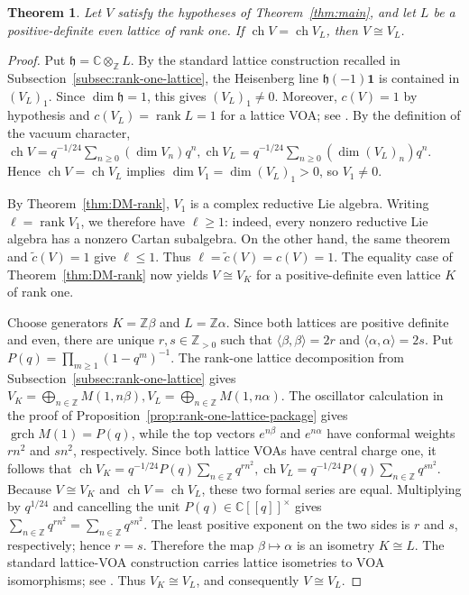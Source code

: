 \documentclass[12pt,leqno]{amsart}
\numberwithin{equation}{section} \newtheorem{thm}{Theorem}[section] \newtheorem{lem}[thm]{Lemma} \newtheorem{ex}[thm]{Example} \newtheorem{prop}[thm]{Proposition} \newtheorem{cor}[thm]{Corollary} \newtheorem{defi}[thm]{Definition} \newtheorem{rmk}[thm]{Remark} \newtheorem{notation}[thm]{Notation}
\newcommand{\one}{\mathbf{1}}
\newcommand{\ch}{\operatorname{ch}}
\newcommand{\grch}{\operatorname{grch}}
\def\Z{\mathbb{Z}} \def\N{\mathbb{N}} \def\A{\mathbb{A}} \def\C{\mathbb{C}} \def\R{\mathbb{R}} \def\Q{\mathbb{Q}} \def\F{\mathbb{F}}
\begin{document}
\begin{thm}\label{thm:lattice-rigidity}
Let $V$ satisfy the hypotheses of Theorem~\ref{thm:main}, and let $L$ be a positive-definite even lattice of rank one. If \(\ch V=\ch V_L\), then \(V\cong V_L\).
\end{thm}

\begin{proof}
Put $\mathfrak h=\C\otimes_{\Z}L$. By the standard lattice construction recalled in Subsection~\ref{subsec:rank-one-lattice}, the Heisenberg line $\mathfrak h(-1)\one$ is contained in $(V_L)_1$. Since $\dim\mathfrak h=1$, this gives $(V_L)_1\ne0$. Moreover, $c(V)=1$ by hypothesis and $c(V_L)=\operatorname{rank}L=1$ for a lattice VOA; see \cite[Chapter~8]{FLM}. By the definition of the vacuum character, \(\ch V=q^{-1/24}\sum_{n\ge0}(\dim V_n)q^n, \ch V_L=q^{-1/24}\sum_{n\ge0}(\dim (V_L)_n)q^n\). Hence \(\ch V=\ch V_L\) implies \(\dim V_1=\dim (V_L)_1>0\), so $V_1\ne0$.

By Theorem~\ref{thm:DM-rank}, $V_1$ is a complex reductive Lie algebra. Writing \(\ell=\operatorname{rank}V_1\), we therefore have $\ell\ge1$: indeed, every nonzero reductive Lie algebra has a nonzero Cartan subalgebra. On the other hand, the same theorem and \(\widetilde c(V)=1\) give \(\ell\le1\). Thus \(\ell=\widetilde c(V)=c(V)=1.\) The equality case of Theorem~\ref{thm:DM-rank} now yields \(V\cong V_K\) for a positive-definite even lattice $K$ of rank one.

Choose generators $K=\Z\beta$ and $L=\Z\alpha$. Since both lattices are positive definite and even, there are unique $r,s\in\Z_{>0}$ such that \(\langle\beta,\beta\rangle=2r\) and \(\langle\alpha,\alpha\rangle=2s\). Put \(P(q)=\prod_{m\ge1}(1-q^m)^{-1}\). The rank-one lattice decomposition from Subsection~\ref{subsec:rank-one-lattice} gives \(V_K=\bigoplus_{n\in\Z}M(1,n\beta), V_L=\bigoplus_{n\in\Z}M(1,n\alpha).\) The oscillator calculation in the proof of Proposition~\ref{prop:rank-one-lattice-package} gives \(\grch M(1)=P(q)\), while the top vectors $e^{n\beta}$ and $e^{n\alpha}$ have conformal weights $rn^2$ and $sn^2$, respectively. Since both lattice VOAs have central charge one, it follows that \(\ch V_K=q^{-1/24}P(q)\sum_{n\in\Z}q^{rn^2}, \ch V_L=q^{-1/24}P(q)\sum_{n\in\Z}q^{sn^2}\). Because $V\cong V_K$ and \(\ch V=\ch V_L\), these two formal series are equal. Multiplying by $q^{1/24}$ and cancelling the unit $P(q)\in\C[[q]]^{\times}$ gives \(\sum_{n\in\Z}q^{rn^2}=\sum_{n\in\Z}q^{sn^2}.\) The least positive exponent on the two sides is $r$ and $s$, respectively; hence $r=s$. Therefore the map $\beta\mapsto\alpha$ is an isometry $K\cong L$. The standard lattice-VOA construction carries lattice isometries to VOA isomorphisms; see \cite[Chapter~8]{FLM}. Thus \(V_K\cong V_L\), and consequently \(V\cong V_L\).
\end{proof}
\end{document}
